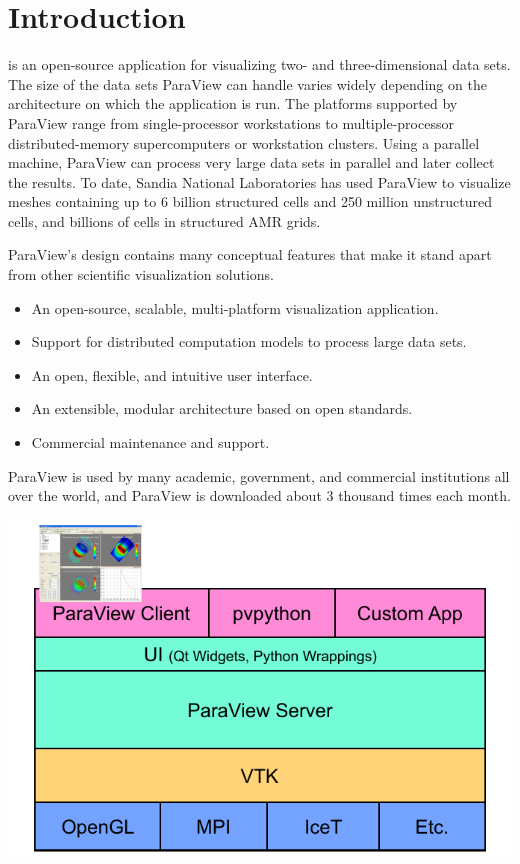 \chapter{Introduction}
\label{chap:Introduction}

 is an open-source application for visualizing two- and
three-dimensional data sets.  The size of the data sets ParaView can handle
varies widely depending on the architecture on which the application is
run.  The platforms supported by ParaView range from single-processor
workstations to multiple-processor distributed-memory supercomputers or
workstation clusters.  Using a parallel machine, ParaView can process very
large data sets in parallel and later collect the results.  To date, Sandia
National Laboratories has used ParaView to visualize meshes containing up
to 6 billion structured cells and 250 million unstructured cells, and
billions of cells in structured AMR grids.

ParaView’s design contains many conceptual features that make it stand
apart from other scientific visualization solutions.

\begin{itemize}
\item An open-source, scalable, multi-platform visualization application.
\item Support for distributed computation models to process large data sets.
\item An open, flexible, and intuitive user interface.
\item An extensible, modular architecture based on open standards.
\item Commercial maintenance and support.
\end{itemize}

ParaView is used by many academic, government, and commercial institutions
all over the world, and ParaView is downloaded about 3 thousand times each
month.

\begin{inlinefig}
  \includegraphics{images/ParaViewLibStack}
\end{inlinefig}

